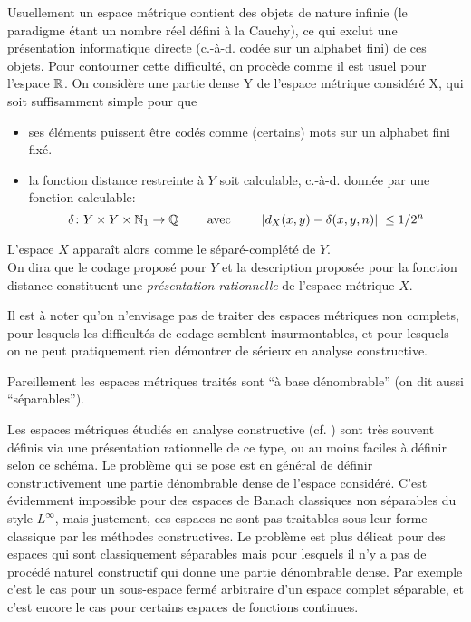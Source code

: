 \smallskip 
Usuellement un espace métrique contient des objets de nature infinie (le 
paradigme étant un nombre réel défini à la Cauchy), 
ce qui exclut une présentation informatique directe (c.-à-d. codée sur un 
alphabet fini) de ces objets. 
Pour contourner cette difficulté, on procède comme il est usuel pour 
l'espace  $\mathbb {R}$. On considère une partie dense  Y  de l'espace métrique 
considéré  X, qui soit suffisamment simple pour que 
\begin{itemize}
\item ses éléments puissent être codés comme (certains) mots sur un 
alphabet fini fixé.
\item la fonction distance restreinte à  $Y$  soit calculable, c.-à-d. 
donnée par une fonction calculable:
\[
\delta\colon  Y\times Y\times \mathbb {N}_1\rightarrow \mathbb {Q} \; \qquad \hbox{avec}\qquad \; 
\left|{d_X(x,y) - \delta(x,y,n)}\right| \;  \leq 1/2^n
\]
\end{itemize}
L'espace  $X$  apparaît alors comme le séparé-complété de  $Y$.\\
On dira que le codage proposé pour  $Y$  et la description proposée pour la fonction distance constituent une {\em présentation rationnelle} de l'espace 
métrique  $X$.
 
Il est à noter qu'on n'envisage pas de traiter des espaces métriques non 
complets, pour lesquels les difficultés de codage semblent insurmontables, et pour lesquels on ne peut pratiquement rien démontrer de sérieux en analyse constructive.

Pareillement les espaces métriques traités sont ``à base dénombrable'' 
(on dit aussi ``séparables'').

\smallskip Les espaces métriques étudiés en analyse constructive (cf. 
\cite{fBB}) sont très souvent définis via une présentation rationnelle de 
ce type, ou au moins faciles à définir selon ce schéma. Le problème qui 
se pose est en général de définir constructivement une partie 
dénombrable dense de l'espace considéré. C'est évidemment impossible 
pour des espaces de Banach classiques non séparables du style  $L^\infty$, 
mais justement, ces espaces ne sont pas traitables sous leur forme classique par 
les méthodes 
constructives. Le problème est plus délicat pour des espaces qui sont 
classiquement séparables mais pour lesquels il n'y a pas de procédé 
naturel constructif qui donne une partie dénombrable dense. Par exemple c'est 
le cas pour un sous-espace fermé arbitraire d'un espace complet séparable, 
et c'est encore le cas pour certains espaces de fonctions continues.

